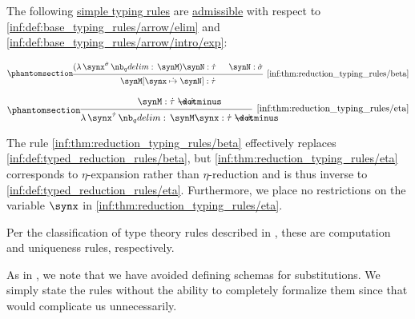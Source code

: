 \begin{proposition}\label{thm:reduction_typing_rules}
  The following \hyperref[def:simple_typing_rule]{simple typing rules} are \hyperref[con:inference_rule_admissibility]{admissible} with respect to \ref{inf:def:base_typing_rules/arrow/elim} and \ref{inf:def:base_typing_rules/arrow/intro/exp}:
  \begin{paracol}{2}
    \begin{leftcolumn}
      \begin{equation*}\taglabel[\ensuremath{ \rightarrow_\beta }]{inf:thm:reduction_typing_rules/beta}
        \begin{prooftree}
          \hypo{ (\qabs {\synx^{\syn\sigma}} \synM) \synN: \syn\tau }
          \hypo{ \synN: \syn\sigma }
          \infer2[\ref{inf:thm:reduction_typing_rules/beta}]{ \synM[\synx \synsubst \synN]: \syn\tau }.
        \end{prooftree}
      \end{equation*}
    \end{leftcolumn}

    \begin{rightcolumn}
      \begin{equation*}\taglabel[\ensuremath{ \leftarrow_\eta }]{inf:thm:reduction_typing_rules/eta}
        \begin{prooftree}
          \hypo{ \synM: \syn\tau \synimplies \syn\sigma }
          \infer1[\ref{inf:thm:reduction_typing_rules/eta}]{ \qabs {\synx^{\syn\tau}} \synM \synx: \syn\tau \synimplies \syn\sigma }.
        \end{prooftree}
      \end{equation*}
    \end{rightcolumn}
  \end{paracol}
\end{proposition}
\begin{comments}
  \item The rule \ref{inf:thm:reduction_typing_rules/beta} effectively replaces \ref{inf:def:typed_reduction_rules/beta}, but \ref{inf:thm:reduction_typing_rules/eta} corresponds to \( \eta \)-expansion rather than \( \eta \)-reduction and is thus inverse to \ref{inf:def:typed_reduction_rules/eta}. Furthermore, we place no restrictions on the variable \( \synx \) in \ref{inf:thm:reduction_typing_rules/eta}.

  \item Per the classification of type theory rules described in , these are computation and uniqueness rules, respectively.

  \item As in , we note that we have avoided defining schemas for substitutions. We simply state the rules without the ability to completely formalize them since that would complicate us unnecessarily.
\end{comments}
